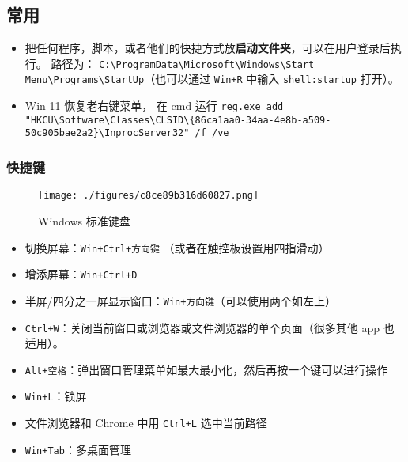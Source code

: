 
\subsection{常用}
\begin{itemize}
\item 把任何程序，脚本，或者他们的快捷方式放\textbf{启动文件夹}，可以在用户登录后执行。 路径为： \verb`C:\ProgramData\Microsoft\Windows\Start Menu\Programs\StartUp`（也可以通过 \verb`Win+R` 中输入 \verb`shell:startup` 打开）。
\item Win 11 恢复老右键菜单， 在 cmd 运行 \verb`reg.exe add "HKCU\Software\Classes\CLSID\{86ca1aa0-34aa-4e8b-a509-50c905bae2a2}\InprocServer32" /f /ve`
\end{itemize}

\subsubsection{快捷键}
\begin{figure}[ht]
\centering
\texttt{[image: ./figures/c8ce89b316d60827.png]}
\caption{Windows 标准键盘} \label{fig_WinNt_1}
\end{figure}

\begin{itemize}
\item 切换屏幕：\verb`Win+Ctrl+方向键` （或者在触控板设置用四指滑动）
\item 增添屏幕：\verb`Win+Ctrl+D`
\item 半屏/四分之一屏显示窗口：\verb`Win+方向键`（可以使用两个如左上）
\item \verb`Ctrl+W`：关闭当前窗口或浏览器或文件浏览器的单个页面（很多其他 app 也适用）。
\item \verb`Alt+空格`：弹出窗口管理菜单如最大最小化，然后再按一个键可以进行操作
\item \verb`Win+L`：锁屏
\item 文件浏览器和 Chrome 中用 \verb`Ctrl+L` 选中当前路径
\item \verb`Win+Tab`：多桌面管理
\end{itemize}

